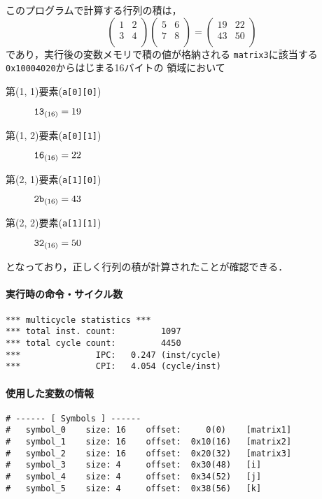 このプログラムで計算する行列の積は，
\begin{equation*}
  \begin{pmatrix}
    1 & 2 \\
    3 & 4 \\
  \end{pmatrix}
  \begin{pmatrix}
    5 & 6 \\
    7 & 8 \\
  \end{pmatrix}
  =
  \begin{pmatrix}
    19 & 22 \\
    43 & 50 \\
  \end{pmatrix}
\end{equation*}
であり，実行後の変数メモリで積の値が格納される
\verb|matrix3|に該当する\verb|0x10004020|からはじまる16バイトの
領域において
\begin{description}
  \item[第(1, 1)要素(\texttt{a[0][0]})] $\verb|13|_{(16)} = 19$  
  \item[第(1, 2)要素(\texttt{a[0][1]})] $\verb|16|_{(16)} = 22$  
  \item[第(2, 1)要素(\texttt{a[1][0]})] $\verb|2b|_{(16)} = 43$  
  \item[第(2, 2)要素(\texttt{a[1][1]})] $\verb|32|_{(16)} = 50$  
\end{description}
となっており，正しく行列の積が計算されたことが確認できる．

\paragraph*{実行時の命令・サイクル数}
\begin{Verbatim}[numbers=none, frame=single,
fontsize=\small, baselinestretch=0.8]
*** multicycle statistics ***
*** total inst. count:         1097
*** total cycle count:         4450
***               IPC:   0.247 (inst/cycle)
***               CPI:   4.054 (cycle/inst)
\end{Verbatim}

\paragraph*{使用した変数の情報}
\begin{Verbatim}[numbers=none, frame=single,
  fontsize=\small, baselinestretch=0.8]
# ------ [ Symbols ] ------
# 	symbol_0 	size: 16 	offset:     0(0) 	[matrix1]
# 	symbol_1 	size: 16 	offset:  0x10(16) 	[matrix2]
# 	symbol_2 	size: 16 	offset:  0x20(32) 	[matrix3]
# 	symbol_3 	size: 4 	offset:  0x30(48) 	[i]
# 	symbol_4 	size: 4 	offset:  0x34(52) 	[j]
# 	symbol_5 	size: 4 	offset:  0x38(56) 	[k]  
\end{Verbatim}

